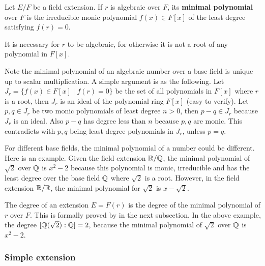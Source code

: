 \documentclass[../main.tex]{subfiles}
\begin{document}
\begin{definition} 
\reversemarginpar
{}
Let $E/F$ be a field extension. If $r$ is algebraic over $F$, its \textbf{minimal polynomial} over $F$ is the irreducible monic polynomial $f(x) \in F[x]$ of the least degree satisfying $f(r)=0$.
\end{definition}

It is necessary for $r$ to be algebraic, for otherwise it is not a root of any polynomial in $F[x]$.

\reversemarginpar
{}
Note the minimal polynomial of an algebraic number over a base field is unique up to scalar multiplication. A simple argument is as the following. Let $J_r = \{f(x) \in F[x] \mid f(r)=0\}$ be the set of all polynomials in $F[x]$ where $r$ is a root, then $J_r$ is an ideal of the polynomial ring $F[x]$ (easy to verify). Let $p, q \in J_r$ be two monic polynomials of least degree $n > 0$, then $p-q \in J_r$ because $J_r$ is an ideal. Also $p-q$ has degree less than $n$ because $p,q$ are monic. This contradicts with $p,q$ being least degree polynomials in $J_r$, unless $p=q$.   

For different base fields, the minimal polynomial of a number could be different. Here is an example. Given the field extension $\mathbb{R}/\mathbb{Q}$, the minimal polynomial of $\sqrt{2}$ over $\mathbb{Q}$ is $x^2-2$ because this polynomial is monic, irreducible and has the least degree over the base field $\mathbb{Q}$ where $\sqrt{2}$ is a root. However, in the field extension $\mathbb{R}/\mathbb{R}$, the minimal polynomial for $\sqrt{2}$ is $x-\sqrt{2}$.

The degree of an extension $E=F(r)$ is the degree of the minimal polynomial of $r$ over $F$. This is formally proved by  in the next subsection. In the above example, the degree $[\mathbb{Q}(\sqrt{2}):\mathbb{Q}]=2$, because the minimal polynomial of $\sqrt{2}$ over $\mathbb{Q}$ is $x^2-2$. 


\subsubsection{Simple extension}

\end{document}
